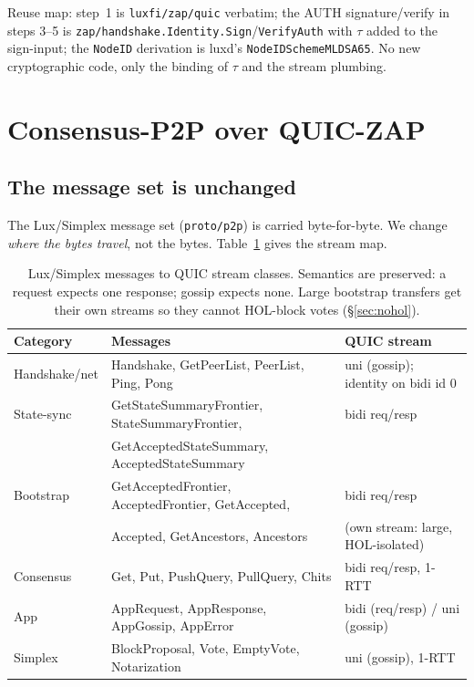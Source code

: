 \documentclass[11pt,a4paper]{article}
\newcommand{\msg}[1]{\textsf{#1}}
\newcommand{\code}[1]{\texttt{#1}}
\begin{document}
Reuse map: step~1 is \code{luxfi/zap/quic} verbatim; the \msg{AUTH}
signature/verify in steps 3--5 is
\code{zap/handshake.Identity.Sign}/\code{VerifyAuth} with $\tau$ added to
the sign-input; the \code{NodeID} derivation is luxd's
\code{NodeIDSchemeMLDSA65}. No new cryptographic code, only the binding
of $\tau$ and the stream plumbing.

\section{Consensus-P2P over QUIC-ZAP}\label{sec:consensus}

\subsection{The message set is unchanged}

The Lux/Simplex message set (\code{proto/p2p}) is carried
byte-for-byte. We change \emph{where the bytes travel}, not the bytes.
Table~\ref{tab:msgmap} gives the stream map.

\begin{table}[h]\centering\small
\begin{tabular}{@{}lll@{}}
\toprule
\textbf{Category} & \textbf{Messages} & \textbf{QUIC stream} \\
\midrule
Handshake/net & \msg{Handshake}, \msg{GetPeerList}, \msg{PeerList}, \msg{Ping}, \msg{Pong} & uni (gossip); identity on bidi id 0 \\
State-sync & \msg{GetStateSummaryFrontier}, \msg{StateSummaryFrontier}, & bidi req/resp \\
           & \msg{GetAcceptedStateSummary}, \msg{AcceptedStateSummary} & \\
Bootstrap & \msg{GetAcceptedFrontier}, \msg{AcceptedFrontier}, \msg{GetAccepted}, & bidi req/resp \\
          & \msg{Accepted}, \msg{GetAncestors}, \msg{Ancestors} & (own stream: large, HOL-isolated) \\
Consensus & \msg{Get}, \msg{Put}, \msg{PushQuery}, \msg{PullQuery}, \msg{Chits} & bidi req/resp, 1-RTT \\
App & \msg{AppRequest}, \msg{AppResponse}, \msg{AppGossip}, \msg{AppError} & bidi (req/resp) / uni (gossip) \\
Simplex & \msg{BlockProposal}, \msg{Vote}, \msg{EmptyVote}, \msg{Notarization} & uni (gossip), 1-RTT \\
\bottomrule
\end{tabular}
\caption{Lux/Simplex messages to QUIC stream classes. Semantics
are preserved: a request expects one response; gossip expects none.
Large bootstrap transfers get their own streams so they cannot
HOL-block votes (\S\ref{sec:nohol}).}
\label{tab:msgmap}
\end{table}
\end{document}
